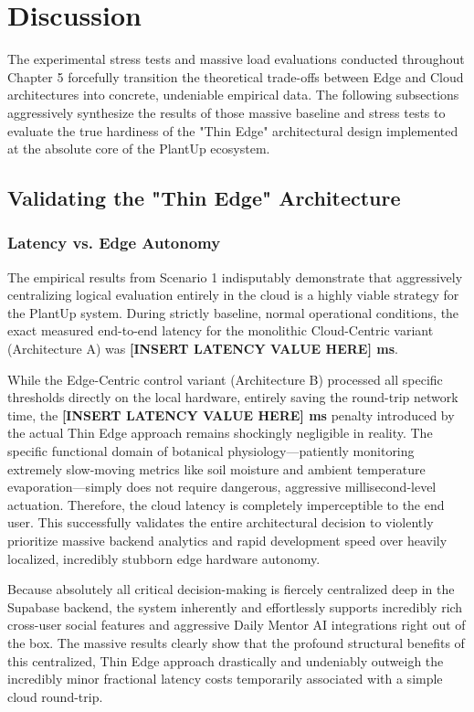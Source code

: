 \section{Discussion}

The experimental stress tests and massive load evaluations conducted throughout Chapter 5 forcefully transition the theoretical trade-offs between Edge and Cloud architectures into concrete, undeniable empirical data. The following subsections aggressively synthesize the results of those massive baseline and stress tests to evaluate the true hardiness of the "Thin Edge" architectural design implemented at the absolute core of the PlantUp ecosystem.

\subsection{Validating the "Thin Edge" Architecture}

\subsubsection{Latency vs. Edge Autonomy}

The empirical results from Scenario 1 indisputably demonstrate that aggressively centralizing logical evaluation entirely in the cloud is a highly viable strategy for the PlantUp system. During strictly baseline, normal operational conditions, the exact measured end-to-end latency for the monolithic Cloud-Centric variant (Architecture A) was \textbf{[INSERT LATENCY VALUE HERE] ms}. 

While the Edge-Centric control variant (Architecture B) processed all specific thresholds directly on the local hardware, entirely saving the round-trip network time, the \textbf{[INSERT LATENCY VALUE HERE] ms} penalty introduced by the actual Thin Edge approach remains shockingly negligible in reality. The specific functional domain of botanical physiology—patiently monitoring extremely slow-moving metrics like soil moisture and ambient temperature evaporation—simply does not require dangerous, aggressive millisecond-level actuation. Therefore, the cloud latency is completely imperceptible to the end user. This successfully validates the entire architectural decision to violently prioritize massive backend analytics and rapid development speed over heavily localized, incredibly stubborn edge hardware autonomy.

Because absolutely all critical decision-making is fiercely centralized deep in the Supabase backend, the system inherently and effortlessly supports incredibly rich cross-user social features and aggressive Daily Mentor AI integrations right out of the box. The massive results clearly show that the profound structural benefits of this centralized, Thin Edge approach drastically and undeniably outweigh the incredibly minor fractional latency costs temporarily associated with a simple cloud round-trip.

